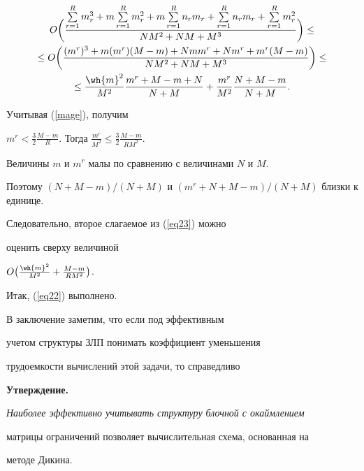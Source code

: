 \begin{pf}
\begin{multline*}
O\bigg(\frac{\sum\limits_{r=1}^Rm_r^3+m\sum\limits_{r=1}^Rm_r^2+


m\sum\limits_{r=1}^Rn_rm_r+


\sum\limits_{r=1}^Rn_rm_r+\sum\limits_{r=1}^Rm_r^2}


{NM^2+NM+M^3}\bigg) \leq \\


\leq O\bigg(\frac{(m^r)^3+m(m^r)(M-m)+Nmm^r+Nm^r+m^r(M-m)}


{NM^2+NM+M^3}\bigg) \leq \\


\leq \frac{\wh{m}^2}{M^2}\frac{m^r+M-m+N}{N+M} +


\frac{m^r}{M^2}\frac{N+M-m}{N+M}.


\end{multline*}


Учитывая (\ref{mage}), получим


$m^r<\frac{3}{2}\frac{M-m}{R}$. Тогда $\frac{m^r}{M^2}\leq


\frac{3}{2}\frac{M-m}{RM^2}$.


Величины $m$ и $m^r$ малы по сравнению с величинами $N$ и $M$.


Поэтому $(N+M-m)/(N+M)$ и $(m^r+N+M-m)/(N+M)$ близки к единице.


Следовательно, второе слагаемое из (\ref{eq23}) можно


оценить сверху величиной


$O\big(\frac{\wh{m}^2}{M^2} +\frac{M-m}{RM^2}\big)$.


Итак, (\ref{eq22}) выполнено.


\end{pf}





В заключение заметим, что если под эффективным


учетом структуры ЗЛП понимать коэффициент уменьшения


трудоемкости вычислений этой задачи, то справедливо


\medskip





{\bf Утверждение.}


{\it Наиболее эффективно учитывать структуру блочной с окаймлением


матрицы ограничений позволяет вычислительная схема, основанная на


методе Дикина.}


\medskip





